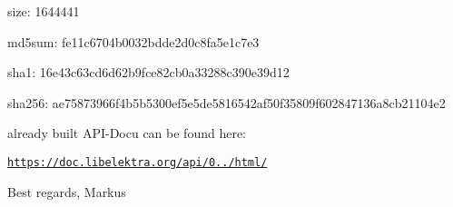 \begin{DoxyItemize}
\item size\+: 1644441
\item md5sum\+: fe11c6704b0032bdde2d0c8fa5e1c7e3
\item sha1\+: 16e43c63cd6d62b9fce82cb0a33288c390e39d12
\item sha256\+: ae75873966f4b5b5300ef5e5de5816542af50f35809f602847136a8cb21104e2
\end{DoxyItemize}

already built A\+P\+I-\/\+Docu can be found here\+:

\href{https://doc.libelektra.org/api/0.8.8/html/}{\tt https\+://doc.\+libelektra.\+org/api/0../html/}

Best regards, Markus 